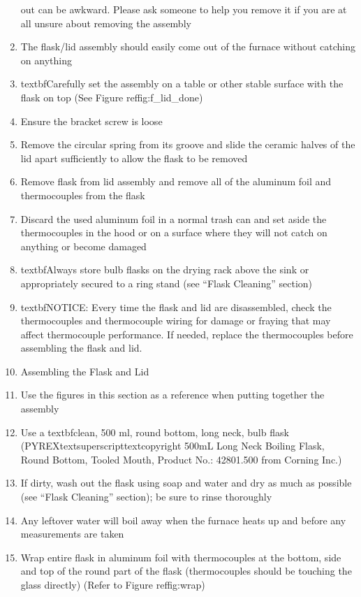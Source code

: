 \begin{enumerate}
  out can be awkward. Please ask someone to help you remove it if you
  are at all unsure about removing the assembly
\item
  The flask/lid assembly should easily come out of the furnace without
  catching on anything
\item
  textbfCarefully set the assembly on a table or other stable surface
  with the flask on top (See Figure reffig:f\_lid\_done)
\item
  Ensure the bracket screw is loose
\item
  Remove the circular spring from its groove and slide the ceramic
  halves of the lid apart sufficiently to allow the flask to be removed
\item
  Remove flask from lid assembly and remove all of the aluminum foil and
  thermocouples from the flask
\item
  Discard the used aluminum foil in a normal trash can and set aside the
  thermocouples in the hood or on a surface where they will not catch on
  anything or become damaged
\item
  textbfAlways store bulb flasks on the drying rack above the sink or
  appropriately secured to a ring stand (see ``Flask Cleaning'' section)
\item
  textbfNOTICE: Every time the flask and lid are disassembled, check the
  thermocouples and thermocouple wiring for damage or fraying that may
  affect thermocouple performance. If needed, replace the thermocouples
  before assembling the flask and lid.
\item
  Assembling the Flask and Lid
\item
  Use the figures in this section as a reference when putting together
  the assembly
\item
  Use a textbfclean, 500 ml, round bottom, long neck, bulb flask
  (PYREXtextsuperscripttextcopyright 500mL Long Neck Boiling Flask,
  Round Bottom, Tooled Mouth, Product No.: 42801.500 from Corning Inc.)
\item
  If dirty, wash out the flask using soap and water and dry as much as
  possible (see ``Flask Cleaning'' section); be sure to rinse thoroughly
\item
  Any leftover water will boil away when the furnace heats up and before
  any measurements are taken
\item
  Wrap entire flask in aluminum foil with thermocouples at the bottom,
  side and top of the round part of the flask (thermocouples should be
  touching the glass directly) (Refer to Figure reffig:wrap)

\end{enumerate}
